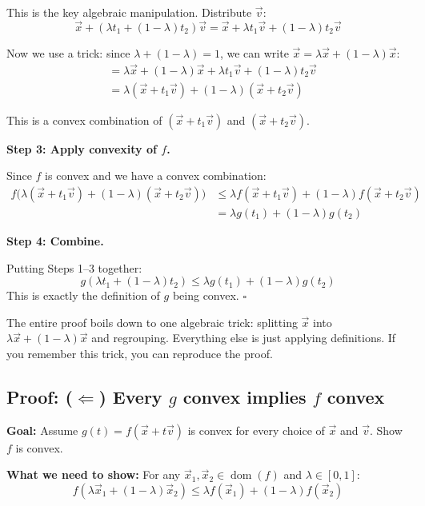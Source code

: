 \documentclass[10pt]{article}
\theoremstyle{definition}
\theoremstyle{plain}
\DeclareMathOperator{\dom}{dom}
\begin{document}
This is the key algebraic manipulation. Distribute $\vec{v}$:
\[
    \vec{x} + (\lambda t_1 + (1-\lambda)t_2)\vec{v} = \vec{x} + \lambda t_1 \vec{v} + (1-\lambda) t_2 \vec{v}
\]

Now we use a trick: since $\lambda + (1-\lambda) = 1$, we can write $\vec{x} = \lambda \vec{x} + (1-\lambda)\vec{x}$:
\begin{align*}
    &= \lambda \vec{x} + (1-\lambda)\vec{x} + \lambda t_1 \vec{v} + (1-\lambda) t_2 \vec{v} \\
    &= \lambda(\vec{x} + t_1 \vec{v}) + (1-\lambda)(\vec{x} + t_2 \vec{v})
\end{align*}

This is a convex combination of $(\vec{x} + t_1 \vec{v})$ and $(\vec{x} + t_2 \vec{v})$.

\textbf{Step 3: Apply convexity of $f$.}

Since $f$ is convex and we have a convex combination:
\begin{align*}
    f\big(\lambda(\vec{x} + t_1 \vec{v}) + (1-\lambda)(\vec{x} + t_2 \vec{v})\big) &\le \lambda f(\vec{x} + t_1 \vec{v}) + (1-\lambda) f(\vec{x} + t_2 \vec{v}) \\
    &= \lambda g(t_1) + (1-\lambda) g(t_2)
\end{align*}

\textbf{Step 4: Combine.}

Putting Steps 1--3 together:
\[
    g(\lambda t_1 + (1-\lambda) t_2) \le \lambda g(t_1) + (1-\lambda) g(t_2)
\]
This is exactly the definition of $g$ being convex. $\square$

\begin{tcolorbox}[colframe=black!50, title={\small Step 2 is the only hard part}]
The entire proof boils down to one algebraic trick: splitting $\vec{x}$ into $\lambda \vec{x} + (1-\lambda)\vec{x}$ and regrouping. Everything else is just applying definitions. If you remember this trick, you can reproduce the proof.
\end{tcolorbox}

\subsection{Proof: ($\Leftarrow$) Every $g$ convex implies $f$ convex}

\textbf{Goal:} Assume $g(t) = f(\vec{x} + t\vec{v})$ is convex for every choice of $\vec{x}$ and $\vec{v}$. Show $f$ is convex.

\textbf{What we need to show:} For any $\vec{x}_1, \vec{x}_2 \in \dom(f)$ and $\lambda \in [0,1]$:
\[
    f(\lambda \vec{x}_1 + (1-\lambda)\vec{x}_2) \le \lambda f(\vec{x}_1) + (1-\lambda) f(\vec{x}_2)
\]
\end{document}
